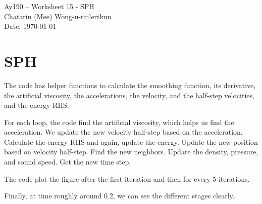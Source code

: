 \documentclass[11pt,letterpaper]{article}
\begin{document}
\begin{center}
\Large
Ay190 -- Worksheet 15 - SPH \\    %
Chatarin (Mee) Wong-u-railertkun\\
Date: \today
\end{center}

\section{SPH}


The code has helper functions to calculate the smoothing function, its derivative, the artificial viscosity, the accelerations, the velocity, and the half-step velocities, and the energy RHS.

For each loop, the code find the artificial viscosity, which helps us find the acceleration. We update the new velocity half-step based on the acceleration. Calculate the energy RHS and again, update the energy. Update the new position based on velocity half-step. Find the new neighbors. Update the density, pressure, and sound speed. Get the new time step.

The code plot the figure after the first iteration and then for every 5 iterations.

Finally, at time roughly around 0.2, we can see the different stages clearly.
	
\end{document}
